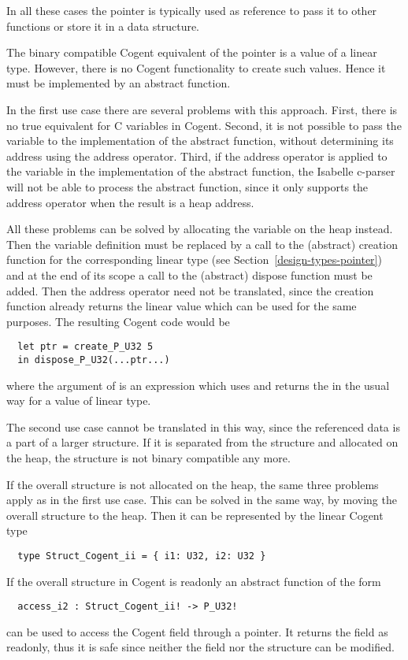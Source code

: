 In all these cases the pointer is typically used as reference to pass it to other functions or store it
in a data structure.

The binary compatible Cogent equivalent of the pointer is a value of a linear type. However, there is
no Cogent functionality to create such values. Hence it must be implemented by an abstract function.

In the first use case there are several problems with this approach. First, there is no true equivalent
for C variables in Cogent. Second, it is not possible to pass the variable to the implementation of the
abstract function, without determining its address using the address operator. Third, if the address
operator is applied to the variable in the implementation of the abstract function, the Isabelle c-parser
will not be able to process the abstract function, since it only supports the address operator when 
the result is a heap address.

All these problems can be solved by allocating the variable on the heap instead. Then the variable definition
must be replaced by a call to the (abstract) creation function for the corresponding linear type 
(see Section~\ref{design-types-pointer}) and 
at the end of its scope a call to the (abstract) dispose function must be added. Then the address
operator need not be translated, since the creation function already returns the linear value which can be 
used for the same purposes. The resulting Cogent code would be
\begin{verbatim}
  let ptr = create_P_U32 5
  in dispose_P_U32(...ptr...)
\end{verbatim}
where the argument of  is an expression which uses and returns the  in the 
usual way for a value of linear type.

The second use case cannot be translated in this way, since the referenced data is a part of a larger structure.
If it is separated from the structure and allocated on the heap, the structure is not binary compatible any more.

If the overall structure is not allocated on the heap, the same three problems apply as in the first use case.
This can be solved in the same way, by moving the overall structure to the heap. Then it can be represented
by the linear Cogent type
\begin{verbatim}
  type Struct_Cogent_ii = { i1: U32, i2: U32 }
\end{verbatim}

If the overall structure in Cogent is readonly an abstract function of the form
\begin{verbatim}
  access_i2 : Struct_Cogent_ii! -> P_U32!
\end{verbatim}
can be used to access the Cogent field through a pointer. It returns the field as readonly, thus it is safe 
since neither the field nor the structure can be modified.

